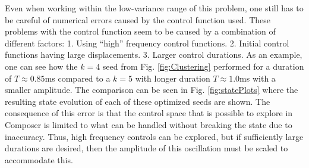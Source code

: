 \documentclass[a4paper, twocolumn]{revtex4-1}
\begin{document}
Even when working within the low-variance range of this problem, one still has to be careful of numerical errors caused by the control function used. These problems with the control function seem to be caused by a combination of different factors:
1. Using ``high'' frequency control functions. 2. Initial control functions having large displacements. 3. Larger control durations. As an example, one can see how the $k=4$ seed from Fig. \ref{fig:Clustering} performed for a duration of $T\approx 0.85$ms compared to a $k=5$ with longer duration  $T\approx 1.0$ms with a smaller amplitude. The comparison can be seen in Fig. \ref{fig:statePlots} where the resulting state evolution of each of these optimized seeds are shown. The consequence of this error is that the control space that is possible to explore in Composer is limited to what can be handled without breaking the state due to inaccuracy. Thus, high frequency controls can be explored, but if sufficiently large durations are desired, then the amplitude of this oscillation must be scaled to accommodate this.
\end{document}
